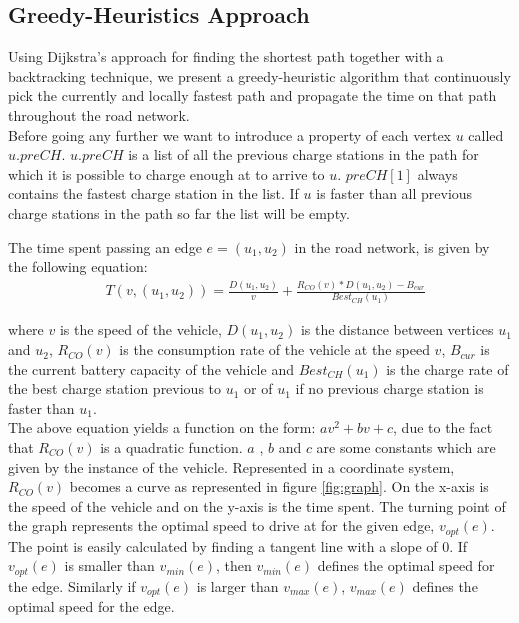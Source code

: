 \subsection{Greedy-Heuristics Approach}
Using Dijkstra's approach for finding the shortest path together with a backtracking technique, we present a 
greedy-heuristic algorithm that continuously pick the currently and locally fastest path and propagate the 
time on that path throughout the road network.\\

Before going any further we want to introduce a property of each vertex $u$ called $u.preCH$. $u.preCH$ 
is a list of all the previous charge stations in the path for which it is possible to charge enough at
to arrive to $u$. $preCH[1]$ always contains the fastest charge station in the list. If $u$ is faster 
than all previous charge stations in the path so far the list will be empty.      
 
The time spent passing an edge $e = (u_1, u_2)$ in the road network, is given by the following equation:
\begin{equation}
\begin{aligned}
 & T(v,(u_1, u_2)) = \frac{D(u_1, u_2)}{v} + \frac{R_{CO}(v) * D(u_1, u_2) - B_{cur}}{Best_{CH}(u_1)}
\end{aligned}
\end{equation}\label{eq:drivingAndCharging}

where $v$ is the speed of the vehicle, $D(u_1, u_2)$ is the distance between vertices $u_1$ and $u_2$,
$R_{CO}(v)$ is the consumption rate of the vehicle at the speed $v$, $B_{cur}$ is the current battery capacity of the vehicle 
and $Best_{CH}(u_1)$ is the charge rate of the best charge station previous to $u_1$ or of $u_1$ if no previous
charge station is faster than $u_1$.\\

The above equation yields a function on the form: $av^2 + bv + c$, due to the fact that 
$R_{CO}(v)$ is a quadratic function. $a$ , $b$ and $c$ are some constants which are given by the instance of the vehicle. 
Represented in a coordinate system, $R_{CO}(v)$ becomes a curve as represented in figure \ref{fig:graph}. On the x-axis is the speed of 
the vehicle and on the y-axis is the time spent. The turning point of the graph represents the optimal speed to drive at for the given edge, $v_{opt}(e)$. The point is easily calculated by finding a tangent line with a slope of 0. If $v_{opt}(e)$ is smaller than $v_{min}(e)$, then $v_{min}(e)$ defines the optimal speed for the edge. Similarly if $v_{opt}(e)$ is larger than $v_{max}(e)$, $v_{max}(e)$ defines the optimal speed for the edge.\\

